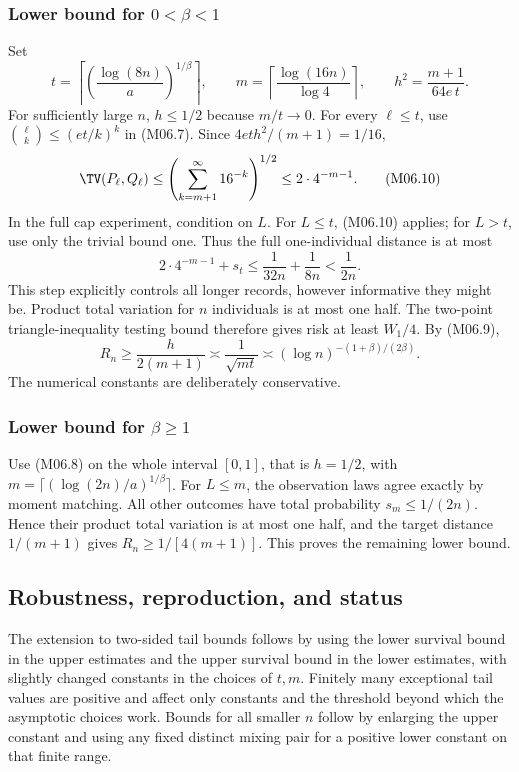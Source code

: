 \documentclass[11pt,a4paper]{article}
\theoremstyle{definition}\newtheorem{definition}[theorem]{Definition}
\theoremstyle{remark}\newtheorem{remark}[theorem]{Remark}
\numberwithin{equation}{section}
\begin{document}
\subsubsection{Lower bound for $0<\beta<1$}
Set
\[
 t=\left\lceil\left(\frac{\log(8n)}a\right)^{1/\beta}\right\rceil,
 \qquad m=\left\lceil\frac{\log(16n)}{\log4}\right\rceil,
 \qquad h^2=\frac{m+1}{64e\,t}.
\]
For sufficiently large $n$, $h\le1/2$ because $m/t\to0$. For every $\ell\le t$, use $\binom{\ell}{k}\le(e t/k)^k$ in (M06.7). Since $4eth^2/(m+1)=1/16$,
\[
 \TV(P_\ell,Q_\ell)
 \le\left(\sum_{k=m+1}^{\infty}16^{-k}\right)^{1/2}
 \le2\cdot4^{-m-1}.
\tag{M06.10}
\]
In the full cap experiment, condition on $L$. For $L\le t$, (M06.10) applies; for $L>t$, use only the trivial bound one. Thus the full one-individual distance is at most
\[
 2\cdot4^{-m-1}+s_t\le\frac1{32n}+\frac1{8n}<\frac1{2n}.
\]
This step explicitly controls all longer records, however informative they might be. Product total variation for $n$ individuals is at most one half. The two-point triangle-inequality testing bound therefore gives risk at least $W_1/4$. By (M06.9),
\[
 R_n\ge\frac{h}{2(m+1)}\asymp\frac1{\sqrt{mt}}
 \asymp(\log n)^{-(1+\beta)/(2\beta)}.
\]
The numerical constants are deliberately conservative.

\subsubsection{Lower bound for $\beta\ge1$}
Use (M06.8) on the whole interval $[0,1]$, that is $h=1/2$, with
$m=\lceil(\log(2n)/a)^{1/\beta}\rceil$.
For $L\le m$, the observation laws agree exactly by moment matching. All other outcomes have total probability $s_m\le1/(2n)$. Hence their product total variation is at most one half, and the target distance $1/(m+1)$ gives $R_n\ge1/[4(m+1)]$. This proves the remaining lower bound.

\subsection{Robustness, reproduction, and status}\label{M06-sec-5}
The extension to two-sided tail bounds follows by using the lower survival bound in the upper estimates and the upper survival bound in the lower estimates, with slightly changed constants in the choices of $t,m$. Finitely many exceptional tail values are positive and affect only constants and the threshold beyond which the asymptotic choices work. Bounds for all smaller $n$ follow by enlarging the upper constant and using any fixed distinct mixing pair for a positive lower constant on that finite range.
\end{document}
